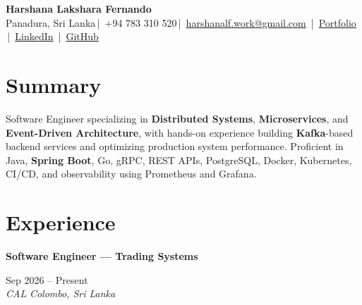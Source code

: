 \documentclass[a4paper,9pt]{extarticle}
\newcommand{\BigDivider}{}
\newcommand{\titleblock}[1]{%
  \begingroup
  \setlength{\fboxsep}{1pt}%
  \colorbox{BlockGray}{\strut\textbf{\textcolor{BlockText}{#1}}}%
  \endgroup
}
\newcommand{\kw}[1]{\textbf{#1}}
\newcommand{\skw}[1]{\textbf{#1}}
\newcommand{\CVExperienceEntry}[4]{
  \noindent \titleblock{#1} \hfill #2 \\
  \noindent \textit{#3} \hfill \textit{#4} \par\vspace{0.22em}
}
\begin{document}

\newcommand{\CVName}{Harshana Lakshara Fernando}
\newcommand{\CVLocation}{Panadura, Sri Lanka}
\newcommand{\CVPhone}{+94 783 310 520}
\newcommand{\CVEmailPersonal}{harshanalf.work@gmail.com}
\newcommand{\CVEmailUni}{lakshara.21@cse.mrt.ac.lk}
\newcommand{\CVPortfolioURL}{https://harshanalf.netlify.app/portfolio}
\newcommand{\CVLinkedinURL}{https://www.linkedin.com/in/harshana-lakshara/}
\newcommand{\CVGithubURL}{https://github.com/UchihaIthachi}
\newcommand{\CVMediumURL}{https://medium.com/@HarshanaLF}

\begin{center}
    {\fontsize{20}{24}\bfseries \CVName}\\[3pt]
    \small
    \CVLocation \,|\, \CVPhone \,|\, \href{mailto:\CVEmailPersonal}{\CVEmailPersonal} \,|\, \href{\CVPortfolioURL}{Portfolio} \,|\, \href{\CVLinkedinURL}{LinkedIn} \,|\, \href{\CVGithubURL}{GitHub}
\end{center}
\vspace{-0.6em}


\section*{Summary}
\BigDivider

\noindent
Software Engineer specializing in \skw{Distributed Systems}, \skw{Microservices}, and \kw{Event-Driven Architecture}, with hands-on experience building \skw{Kafka}-based backend services and optimizing production system performance. Proficient in Java, \skw{Spring Boot}, Go, gRPC, REST APIs, PostgreSQL, Docker, Kubernetes, CI/CD, and observability using Prometheus and Grafana.


\section*{Experience}
\BigDivider

\CVExperienceEntry
{Software Engineer --- Trading Systems}
{Sep 2026 -- Present}
{CAL}
{Colombo, Sri Lanka}
\end{document}
